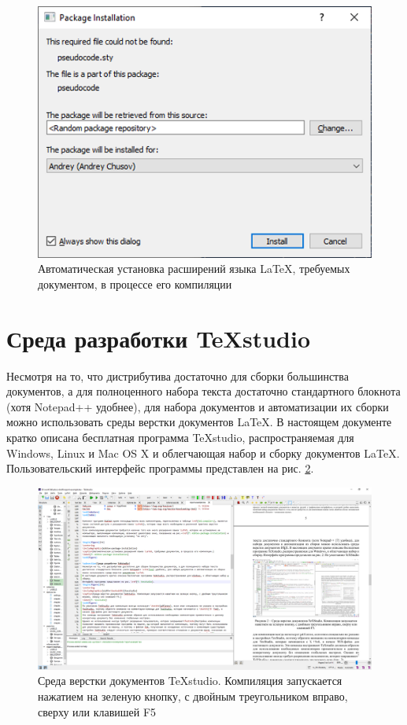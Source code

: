 \documentclass[workbook]{fefudoc}
\begin{document}
\begin{figure}[ht]
\centering
\includegraphics{workbook-extras/miktex-package-installation}
\caption{Автоматическая установка расширений языка \LaTeX, требуемых документом, в процессе его компиляции}
\label{автоустановка расширений miktex}
\end{figure}

\section{Среда разработки TeXstudio}\label{раздел про texstudio}
Несмотря на то, что дистрибутива достаточно для сборки большинства документов, а для полноценного набора текста достаточно стандартного блокнота (хотя Notepad++ \cite{npp} удобнее), для набора документов и автоматизации их сборки можно использовать среды верстки документов \LaTeX.
В настоящем документе кратко описана бесплатная программа TeXstudio, распространяемая для Windows, Linux и Mac OS X и облегчающая набор и сборку документов \LaTeX{}.
Пользовательский интерфейс программы представлен на рис. \ref{скриншот texstudio}.
\begin{figure}[ht]
\centering
\includegraphics[width=\textwidth]{workbook-extras/texstudio}
\caption{Среда верстки документов TeXstudio. Компиляция запускается нажатием на зеленую кнопку, с двойным треугольником вправо, сверху или клавишей F5}
\label{скриншот texstudio}
\end{figure}
\end{document}
